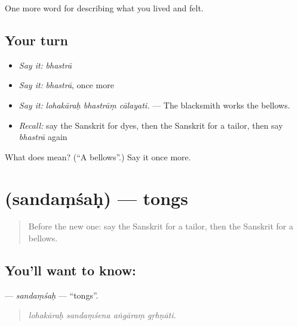 \begin{grammarlens}[title={What you've built}]
One more word for describing what you lived and felt.
\end{grammarlens}

\subsection*{Your turn}
\begin{itemize}
\raggedright
  \item \emph{Say it:} \emph{bhastrā}
  \item \emph{Say it:} \emph{bhastrā}, once more
  \item \emph{Say it:} \emph{lohakāraḥ bhastrāṃ cālayati.} — The blacksmith works the bellows.
  \item \emph{Recall:} say the Sanskrit for dyes, then the Sanskrit for a tailor, then say \emph{bhastrā} again
\end{itemize}

\begin{tcolorbox}[breakable,colback=teal!4,colframe=teal!35!black,title={Before you move on}]
What does  mean? (\textquotedblleft{}A bellows\textquotedblright{}.) Say it once more.
\end{tcolorbox}
\section[\texorpdfstring{\sk{सन्दंशः} (sandaṃśaḥ)}{सन्दंशः (sandaṃśaḥ)}]{ (sandaṃśaḥ) — tongs}

\label{lesson:SA-C507-sandamsah}



\begin{quote}
Before the new one: say the Sanskrit for a tailor, then the Sanskrit for a bellows.
\end{quote}

\subsection*{You'll want to know: }
\textbf{} — \emph{sandaṃśaḥ} — \textquotedblleft{}tongs\textquotedblright{}.

\begin{quote}
   
\end{quote}

\begin{quote}
\emph{lohakāraḥ sandaṃśena aṅgāraṃ gṛhṇāti.}
\end{quote}

